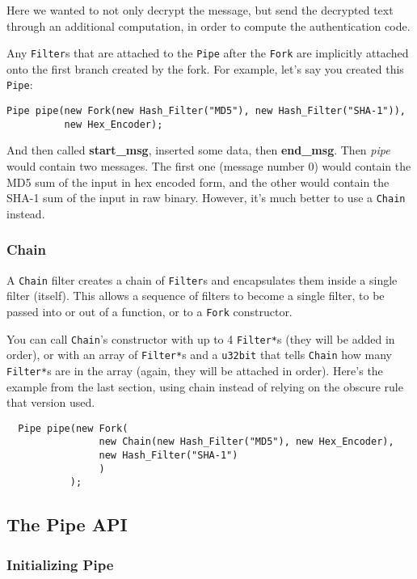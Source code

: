 \documentclass{article}
\newcommand{\function}[1]{\textbf{#1}}
\newcommand{\type}[1]{\texttt{#1}}
\renewcommand{\arg}[1]{\textsl{#1}}
\begin{document}
Here we wanted to not only decrypt the message, but send the decrypted
text through an additional computation, in order to compute the
authentication code.

Any \type{Filter}s that are attached to the \type{Pipe} after the
\type{Fork} are implicitly attached onto the first branch created by
the fork. For example, let's say you created this \type{Pipe}:

\begin{verbatim}
Pipe pipe(new Fork(new Hash_Filter("MD5"), new Hash_Filter("SHA-1")),
          new Hex_Encoder);
\end{verbatim}

And then called \function{start\_msg}, inserted some data, then
\function{end\_msg}. Then \arg{pipe} would contain two messages. The
first one (message number 0) would contain the MD5 sum of the input in
hex encoded form, and the other would contain the SHA-1 sum of the
input in raw binary. However, it's much better to use a \type{Chain}
instead.

\subsubsection{Chain}

A \type{Chain} filter creates a chain of \type{Filter}s and
encapsulates them inside a single filter (itself). This allows a
sequence of filters to become a single filter, to be passed into or
out of a function, or to a \type{Fork} constructor.

You can call \type{Chain}'s constructor with up to 4 \type{Filter*}s
(they will be added in order), or with an array of \type{Filter*}s and
a \type{u32bit} that tells \type{Chain} how many \type{Filter*}s are
in the array (again, they will be attached in order). Here's the
example from the last section, using chain instead of relying on the
obscure rule that version used.

\begin{verbatim}
  Pipe pipe(new Fork(
                new Chain(new Hash_Filter("MD5"), new Hex_Encoder),
                new Hash_Filter("SHA-1")
                )
           );
\end{verbatim}

\subsection{The Pipe API}

\subsubsection{Initializing Pipe}
\end{document}
